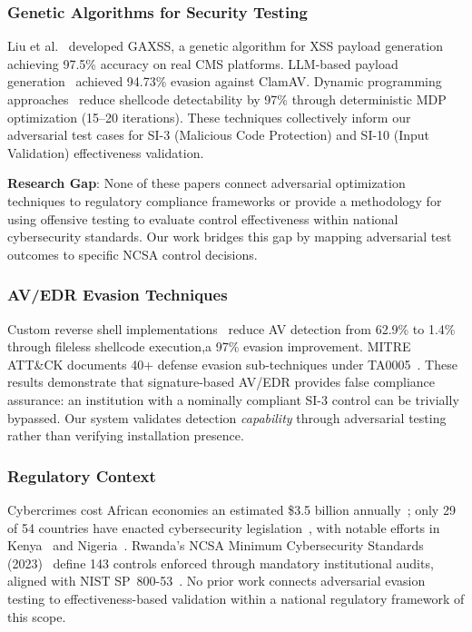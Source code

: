 \documentclass[futureinternet,article,submit,pdftex,moreauthors]{Definitions/mdpi}
\begin{document}
\subsubsection{Genetic Algorithms for Security Testing}

Liu et al.~\cite{ga_xss_paper} developed GAXSS, a genetic algorithm for XSS payload
generation achieving 97.5\% accuracy on real CMS platforms. LLM-based payload
generation~\cite{llm_payload_paper} achieved 94.73\% evasion against ClamAV. Dynamic
programming approaches~\cite{dp_payload_paper} reduce shellcode detectability by 97\%
through deterministic MDP optimization (15--20 iterations). These techniques collectively
inform our adversarial test cases for SI-3 (Malicious Code Protection) and SI-10
(Input Validation) effectiveness validation.

\textbf{Research Gap}: None of these papers connect adversarial optimization techniques to
regulatory compliance frameworks or provide a methodology for using offensive testing to
evaluate control effectiveness within national cybersecurity standards. Our work bridges this
gap by mapping adversarial test outcomes to specific NCSA control decisions.

\subsubsection{AV/EDR Evasion Techniques}

Custom reverse shell implementations~\cite{reverse_shell_paper} reduce AV detection from
62.9\% to 1.4\% through fileless shellcode execution,a 97\% evasion improvement. MITRE
ATT\&CK documents 40+ defense evasion sub-techniques under TA0005~\cite{mitre_attack_sok}.
These results demonstrate that signature-based AV/EDR provides false compliance assurance:
an institution with a nominally compliant SI-3 control can be trivially bypassed. Our system
validates detection \textit{capability} through adversarial testing rather than verifying
installation presence.

\subsubsection{Regulatory Context}

Cybercrimes cost African economies an estimated \$3.5 billion annually~\cite{serianu_africa};
only 29 of 54 countries have enacted cybersecurity legislation~\cite{itu_africa_cyber}, with notable efforts in Kenya~\cite{kenya_cyber_law} and Nigeria~\cite{nigeria_cyber}.
Rwanda's NCSA Minimum Cybersecurity Standards (2023)~\cite{ncsa2023} define 143 controls
enforced through mandatory institutional audits, aligned with NIST SP~800-53~\cite{nist2020}.
No prior work connects adversarial evasion testing to effectiveness-based validation within
a national regulatory framework of this scope.
\end{document}
